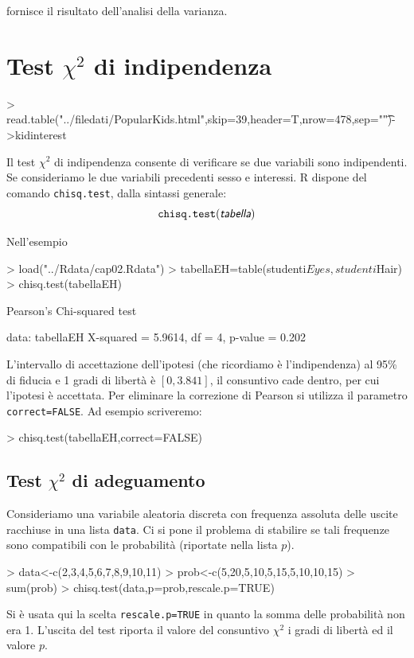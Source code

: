 \documentclass[onecolumn,11pt]{book}
\newcommand{\varia}[1]{\textsl{\textsf{#1}}}
\begin{document}
fornisce il risultato dell'analisi della varianza.

 

\section{Test $\chi^2$  di indipendenza}

\begin{Schunk}
\begin{Sinput}
> read.table("../filedati/PopularKids.html",skip=39,header=T,nrow=478,sep="\t")->kidinterest
\end{Sinput}
\end{Schunk}
Il test $\chi^2$  di indipendenza consente di  verificare se  due variabili sono indipendenti. 
Se consideriamo le due variabili precedenti sesso e interessi.
\textsf{R}  dispone del comando \texttt{chisq.test}, dalla sintassi generale:$$\texttt{chisq.test}(\varia{tabella})$$

Nell'esempio
\begin{Schunk}
\begin{Sinput}
> load("../Rdata/cap02.Rdata")
> tabellaEH=table(studenti$Eyes,studenti$Hair)
> chisq.test(tabellaEH)
\end{Sinput}
\begin{Soutput}
	Pearson's Chi-squared test

data:  tabellaEH
X-squared = 5.9614, df = 4, p-value = 0.202
\end{Soutput}
\end{Schunk}
L'intervallo di accettazione dell'ipotesi (che ricordiamo \`e l'indipendenza) al 95\% di fiducia e 1 gradi di libert\`a \`e  $[0, 3.841]$, il consuntivo cade dentro, per cui l'ipotesi \`e accettata.
Per eliminare la correzione di Pearson si utilizza il parametro  \texttt{correct=FALSE}.
Ad esempio scriveremo:
\begin{Schunk}
\begin{Sinput}
> chisq.test(tabellaEH,correct=FALSE)
\end{Sinput}
\end{Schunk}
  
\subsection{Test $\chi^2$  di adeguamento}
Consideriamo una variabile aleatoria discreta con frequenza assoluta delle uscite racchiuse in una lista \texttt{data}. Ci si pone il problema di stabilire se tali frequenze sono compatibili con le probabilit\`a (riportate nella lista $p$).
\begin{Schunk}
\begin{Sinput}
> data<-c(2,3,4,5,6,7,8,9,10,11)
> prob<-c(5,20,5,10,5,15,5,10,10,15)
> sum(prob)  
> chisq.test(data,p=prob,rescale.p=TRUE)
\end{Sinput}
\end{Schunk}
Si \`e usata qui la scelta \texttt{rescale.p=TRUE} in quanto la somma delle  probabilit\`a non era 1. 
L'uscita del test riporta il valore del consuntivo $\chi^2$ i gradi di libert\`a ed il valore $p$.   
\end{document}
